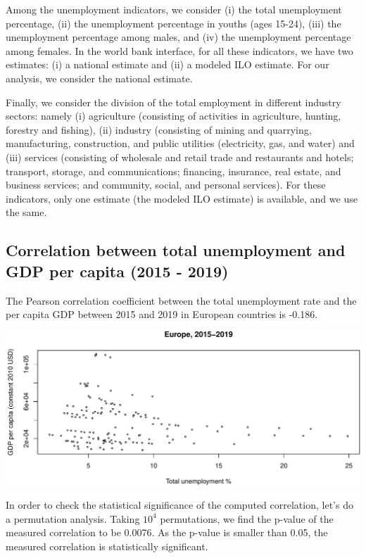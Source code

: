\documentclass[
]{article}
\begin{document}
Among the unemployment indicators, we consider (i) the total
unemployment percentage, (ii) the unemployment percentage in youths
(ages 15-24), (iii) the unemployment percentage among males, and (iv)
the unemployment percentage among females. In the world bank interface,
for all these indicators, we have two estimates: (i) a national estimate
and (ii) a modeled ILO estimate. For our analysis, we consider the
national estimate.

Finally, we consider the division of the total employment in different
industry sectors: namely (i) agriculture (consisting of activities in
agriculture, hunting, forestry and fishing), (ii) industry (consisting
of mining and quarrying, manufacturing, construction, and public
utilities (electricity, gas, and water) and (iii) services (consisting
of wholesale and retail trade and restaurants and hotels; transport,
storage, and communications; financing, insurance, real estate, and
business services; and community, social, and personal services). For
these indicators, only one estimate (the modeled ILO estimate) is
available, and we use the same.

\hypertarget{correlation-between-total-unemployment-and-gdp-per-capita-2015---2019}{%
\subsection{Correlation between total unemployment and GDP per capita
(2015 -
2019)}\label{correlation-between-total-unemployment-and-gdp-per-capita-2015---2019}}

The Pearson correlation coefficient between the total unemployment rate
and the per capita GDP between 2015 and 2019 in European countries is
-0.186.

\includegraphics{main_files/figure-latex/unnamed-chunk-7-1.pdf}

In order to check the statistical significance of the computed
correlation, let's do a permutation analysis. Taking \ensuremath{10^{4}}
permutations, we find the p-value of the measured correlation to be
0.0076. As the p-value is smaller than 0.05, the measured correlation is
statistically significant.
\end{document}
